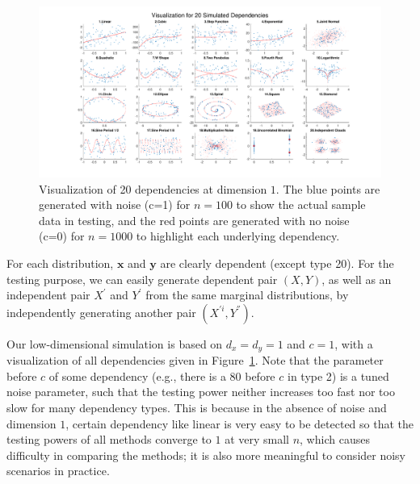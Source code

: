 \documentclass[11pt]{article}
\providecommand{\mb}[1]{\boldsymbol{#1}}
\newcommand{\jv}[1]{{\color{red}{#1}}}
\newcommand{\cs}[1]{{\color{blue}{#1}}}
\begin{document}
\begin{figure}[htbp]
\includegraphics[trim={5cm 0 3.5cm 0},clip, width=1.0\textwidth]{../Figures/Fig0}
\caption{Visualization of 20 dependencies at dimension $1$. The blue points are generated with noise (c=1) for $n=100$ to show the actual sample data in testing, and the red points are generated with no noise (c=0) for $n=1000$ to highlight each underlying dependency.
}
\label{fig0}
\end{figure}



For each distribution, $\mb{x}$ and $\mb{y}$ are clearly dependent (except type 20). For the testing purpose, we can easily generate dependent pair $(X, Y)$, as well as an independent pair $X^{'}$ and $Y^{'}$ from the same marginal distributions, by independently generating another pair $(X^{'i},Y^{''})$.
\jv{explain how. most you set $w$ to zero, but not all.}
\cs{Explained above}
\jv{i don't see where.}
\cs{maybe I didn't get your question; let us chat on this.}

Our low-dimensional simulation is based on $d_{x}=d_{y}=1$ and $c=1$, with a visualization of all dependencies given in Figure~\ref{fig0}. Note that the parameter before $c$ of some dependency (e.g., there is a $80$ before $c$ in type 2) is a tuned noise parameter, such that the testing power neither increases too fast nor too slow for many dependency types. This is because in the absence of noise and dimension $1$, certain dependency like linear is very easy to be detected so that the testing powers of all methods converge to $1$ at very small $n$, which causes difficulty in comparing the methods; it is also more meaningful to consider noisy scenarios in practice. \jv{what is the constant ``before $c$''?}
\cs{say for type 2 cubic, there is a 80 before $c$...}
\jv{oh, ok, specify precisely which equations that refers to.}
\cs{ok, I have put an example above for this constant.}
\jv{the confusion is the word ``each''.  there is not a constant before each, only some.  so i recommend removing the word ``each''. ps - i write this stuff instead of doing it myself because i'm trying to show you.  i can just make the changes myself if you prefer.}
\cs{tried again :-)}
\end{document}
